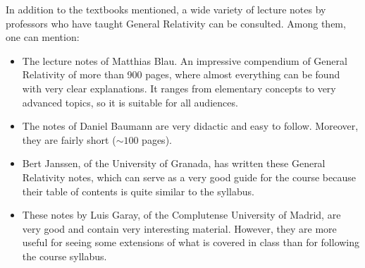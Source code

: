 In addition to the textbooks mentioned, a wide variety of lecture notes by professors who have taught General Relativity can be consulted. Among them, one can mention:
\begin{itemize}[itemsep=0.3em]
\item The lecture notes of Matthias Blau. An impressive compendium of General Relativity of more than 900 pages, where almost everything can be found with very clear explanations. It ranges from elementary concepts to very advanced topics, so it is suitable for all audiences.
\item The notes of Daniel Baumann are very didactic and easy to follow. Moreover, they are fairly short ($\sim100$ pages).
\item Bert Janssen, of the University of Granada, has written these General Relativity notes, which can serve as a very good guide for the course because their table of contents is quite similar to the syllabus.
\item These notes by Luis Garay, of the Complutense University of Madrid, are very good and contain very interesting material. However, they are more useful for seeing some extensions of what is covered in class than for following the course syllabus.
\end{itemize}
